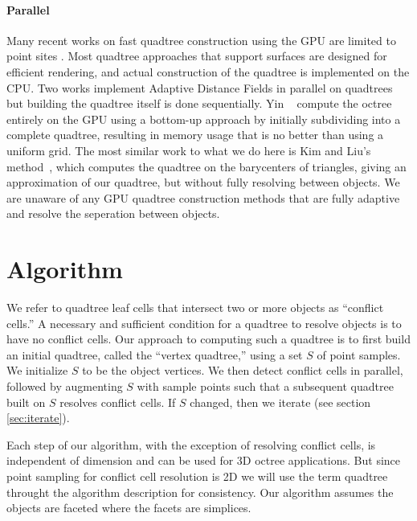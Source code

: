 \documentclass[final,3p,times,twocolumn]{elsarticle}
\begin{document}
\paragraph{Parallel} Many recent works on fast quadtree construction using the GPU are limited to point sites \cite{bedorf2012sparse,karras2012maximizing,zhou2011data}.
 Most quadtree approaches that support surfaces \cite{baert2013out,crassin2009gigavoxels,laine2011efficient,lefebvre2007compressed} are designed for efficient rendering, and actual construction of the quadtree is implemented on the CPU. Two works \cite{bastos2008gpu,park2010cuda} implement Adaptive Distance Fields in parallel on quadtrees but building the quadtree itself is done sequentially.  Yin \etal~ compute the octree entirely on the GPU using a bottom-up approach by initially subdividing into a complete quadtree, resulting in memory usage that is no better than using a uniform grid.
The most similar work to what we do here is Kim and Liu's method~, which computes the quadtree on the barycenters of triangles, giving an approximation of our quadtree, but without fully resolving between objects.
We are unaware of any GPU quadtree construction methods that are fully adaptive and resolve the seperation between objects.

\section{Algorithm}
\label{sec:algorithm}

We refer to quadtree leaf cells that intersect two or more objects as ``conflict cells.'' A necessary and sufficient condition for a quadtree to resolve objects is to have no conflict cells. Our approach to computing such a quadtree is to first build an initial quadtree, called the ``vertex quadtree,'' using a set $S$ of point samples. We initialize $S$ to be the object vertices. We then detect conflict cells in parallel, followed by augmenting $S$ with sample points such that a subsequent quadtree built on $S$ resolves conflict cells. If $S$ changed, then we iterate (see section \ref{sec:iterate}).

Each step of our algorithm, with the exception of resolving conflict cells, is independent of dimension and can be used for 3D octree applications. But since point sampling for conflict cell resolution is 2D we will use the term quadtree throught the algorithm description for consistency. Our algorithm assumes the objects are faceted where the facets are simplices.
\end{document}
